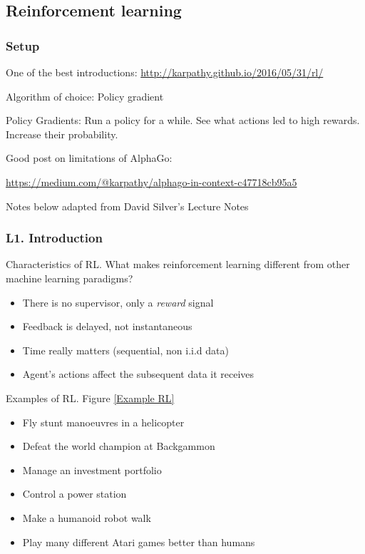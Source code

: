 \documentclass[english]{article}
\begin{document}
\eenum


\subsection{Reinforcement learning}
\subsubsection{Setup}
\benum
\item One of the best introductions: 
\url{http://karpathy.github.io/2016/05/31/rl/}
\item Algorithm of choice: Policy gradient

Policy Gradients: Run a policy for a while. See what actions led to high rewards. Increase their probability.


\item Good post on limitations of AlphaGo: 

\url{https://medium.com/@karpathy/alphago-in-context-c47718cb95a5}


\item Notes below adapted from David Silver's Lecture Notes
\eenum 



\subsubsection{L1. Introduction}
\benum 

\item {Characteristics of RL}.
What makes reinforcement learning different from other machine
learning paradigms?
\begin{itemize}
    \item There is no supervisor, only a \textit{reward} signal
    \item Feedback is delayed, not instantaneous
    \item Time really matters (sequential, non i.i.d data)
    \item Agent’s actions affect the subsequent data it receives
\end{itemize}



\item {Examples of RL}. Figure \ref{Example RL}
\begin{itemize}
    \item Fly stunt manoeuvres in a helicopter
    \item Defeat the world champion at Backgammon
    \item Manage an investment portfolio
    \item Control a power station
    \item Make a humanoid robot walk
    \item Play many different Atari games better than humans
\end{itemize}
\end{document}
